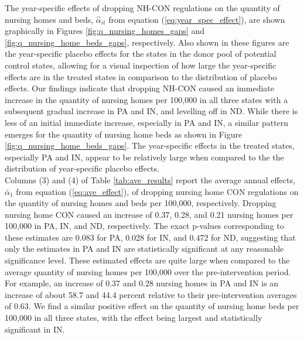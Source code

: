 \documentclass[../Main.tex]{subfiles}
\begin{document}
\indent The year-specific effects of dropping NH-CON regulations on the quantity of nursing homes and beds, $\hat{\alpha}_{it}$ from equation (\ref{eq:year_spec_effect}), are shown graphically in Figures \ref{fig:q_nursing_homes_gaps} and \ref{fig:q_nursing_home_beds_gaps}, respectively. Also shown in these figures are the year-specific placebo effects for the states in the donor pool of potential control states, allowing for a visual inspection of how large the year-specific effects are in the treated states in comparison to the distribution of placebo effects. Our findings indicate that dropping NH-CON caused an immediate increase in the quantity of nursing homes per 100,000 in all three states with a subsequent gradual increase in PA and IN, and levelling off in ND. While there is less of an initial immediate increase, especially in PA and IN, a similar pattern emerges for the quantity of nursing home beds as shown in Figure \ref{fig:q_nursing_home_beds_gaps}. The year-specific effects in the treated states, especially PA and IN, appear to be relatively large when compared to the the distribution of year-specific placebo effects.\\
\indent Columns (3) and (4) of Table \ref{tab:ave_results} report the average annual effects, $\bar{\alpha}_1$ from equation (\ref{eq:ave_effect}), of dropping nursing home CON regulations on the quantity of nursing homes and beds per 100,000, respectively. Dropping nursing home CON caused an increase of 0.37, 0.28, and 0.21 nursing homes per 100,000 in PA, IN, and ND, respectively. The exact p-values corresponding to these estimates are 0.083 for PA, 0.028 for IN, and 0.472 for ND, suggesting that only the estimates in PA and IN are statistically significant at any reasonable significance level. These estimated effects are quite large when compared to the average quantity of nursing homes per 100,000 over the pre-intervention period. For example, an increase of 0.37 and 0.28 nursing homes in PA and IN is an increase of about 58.7 and 44.4 percent relative to their pre-intervention averages of 0.63. We find a similar positive effect on the quantity of nursing home beds per 100,000 in all three states, with the effect being largest and statistically significant in IN.\\
\end{document}
